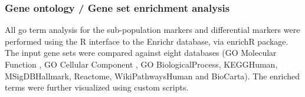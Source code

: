 \subsubsection{\large Gene ontology / Gene set enrichment analysis}

All \gls{go} term analysis for the sub-population markers and differential markers were performed using the R interface to the Enrichr database, via enrichR package. The input gene sets were compared against eight databases (GO \textunderscore Molecular \textunderscore Function , GO \textunderscore Cellular \textunderscore Component , GO \textunderscore Biological\textunderscore Process, KEGG\textunderscore Human, MSigDB\textunderscore Hallmark, Reactome, WikiPathways\textunderscore Human and BioCarta). The enriched terms were further visualized using custom scripts.

